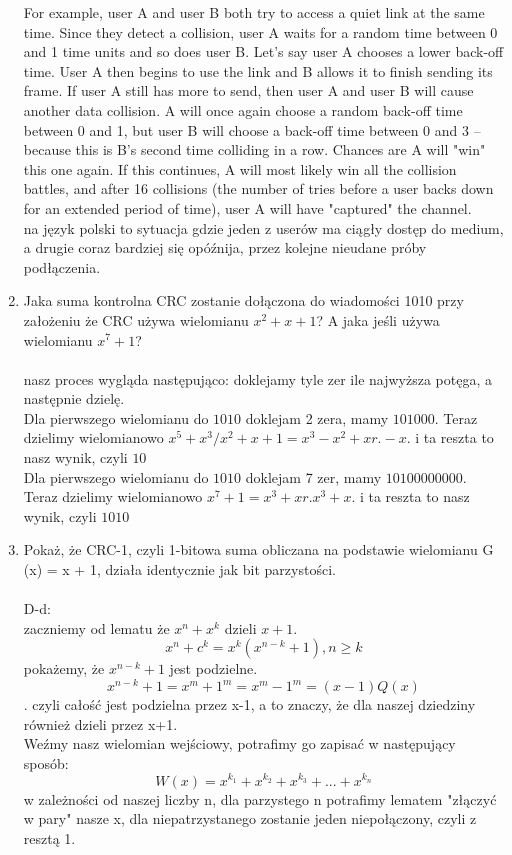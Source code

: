 \documentclass{article}[A4]
\begin{document}
\begin{enumerate}
	For example, user A and user B both try to access a quiet link at the same time. Since they detect a collision, user A waits for a random time between 0 and 1 time units and so does user B. Let's say user A chooses a lower back-off time. User A then begins to use the link and B allows it to finish sending its frame. If user A still has more to send, then user A and user B will cause another data collision. A will once again choose a random back-off time between 0 and 1, but user B will choose a back-off time between 0 and 3 – because this is B's second time colliding in a row. Chances are A will "win" this one again. If this continues, A will most likely win all the collision battles, and after 16 collisions (the number of tries before a user backs down for an extended period of time), user A will have "captured" the channel.\\
	na język polski to sytuacja gdzie jeden z userów ma ciągły dostęp do medium, a drugie coraz bardziej się opóźnija, przez kolejne nieudane próby podłączenia.
	\item{Jaka suma kontrolna CRC zostanie dołączona do wiadomości 1010 przy założeniu że CRC używa wielomianu $x^2 + x + 1$? A jaka jeśli używa wielomianu $x^7 + 1$?}\\\\
	nasz proces wygląda następująco: doklejamy tyle zer ile najwyższa potęga, a następnie dzielę.\\
	Dla pierwszego wielomianu do $1010$ doklejam 2 zera, mamy $101000$. Teraz dzielimy wielomianowo $x^5 + x^3 / x^2 + x + 1 = x^3 - x^2 + x r. -x$. i ta reszta to nasz wynik, czyli $10$\\
	Dla pierwszego wielomianu do $1010$ doklejam 7 zer, mamy $10100000000$. Teraz dzielimy wielomianowo $x^7 + 1 = x^3 + x r. x^3 + x$. i ta reszta to nasz wynik, czyli $1010$\\
	\item{Pokaż, że CRC-1, czyli 1-bitowa suma obliczana na podstawie wielomianu G (x) = x + 1, działa identycznie jak bit parzystości.}\\\\
	D-d:\\
	zaczniemy od lematu że $x^n + x^k$ dzieli $x+1$.
	$$x^n + c^k = x^k(x^{n-k} + 1), n \geq k$$
	pokażemy, że $x^{n-k}+1$ jest podzielne.\\
	$$x^{n-k}+1 = x^m + 1^m = x^m - 1^m = (x-1)Q(x)$$.
	czyli całość jest podzielna przez x-1, a to znaczy, że dla naszej dziedziny również dzieli przez x+1.\\
	Weźmy nasz wielomian wejściowy, potrafimy go zapisać w następujący sposób:
	$$W(x)=x^{k_1} + x^{k_2} + x^{k_3}+...+x^{k_n}$$
	w zależności od naszej liczby n, dla parzystego n  potrafimy lematem "złączyć w pary" nasze x, dla niepatrzystanego zostanie jeden niepołączony, czyli z resztą 1.
\end{enumerate}

 
\end{document}
